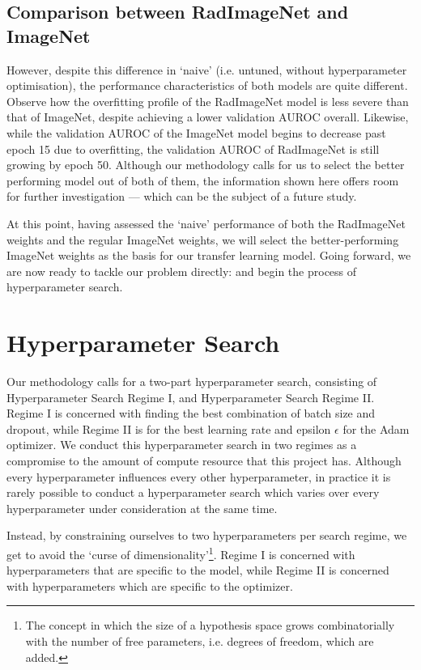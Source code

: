 \subsection{Comparison between RadImageNet and ImageNet}

However, despite this difference in \enquote*{naive} (i.e. untuned, without hyperparameter optimisation), the performance characteristics of both models are quite different. Observe how the overfitting profile of the RadImageNet model is less severe than that of ImageNet, despite achieving a lower validation AUROC overall. Likewise, while the validation AUROC of the ImageNet model begins to decrease past epoch 15 due to overfitting, the validation AUROC of RadImageNet is still growing by epoch 50. Although our methodology calls for us to select the better performing model out of both of them, the information shown here offers room for further investigation --- which can be the subject of a future study.

At this point, having assessed the \enquote*{naive} performance of both the RadImageNet weights and the regular ImageNet weights, we will select the better-performing ImageNet weights as the basis for our transfer learning model. Going forward, we are now ready to tackle our problem directly: and begin the process of hyperparameter search.

\section{Hyperparameter Search}

Our methodology calls for a two-part hyperparameter search, consisting of Hyperparameter Search Regime I, and Hyperparameter Search Regime II. Regime I is concerned with finding the best combination of batch size and dropout, while Regime II is for the best learning rate and epsilon \(\epsilon\) for the Adam optimizer. We conduct this hyperparameter search in two regimes as a compromise to the amount of compute resource that this project has. Although every hyperparameter influences every other hyperparameter, in practice it is rarely possible to conduct a hyperparameter search which varies over every hyperparameter under consideration at the same time.

Instead, by constraining ourselves to two hyperparameters per search regime, we get to avoid the \enquote*{curse of dimensionality}\footnote{The concept in which the size of a hypothesis space grows combinatorially with the number of free parameters, i.e. degrees of freedom, which are added.}. Regime I is concerned with hyperparameters that are specific to the model, while Regime II is concerned with hyperparameters which are specific to the optimizer.

